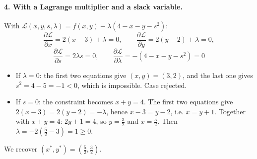 \documentclass[]{article}
\begin{document}
	\paragraph{4. With a Lagrange multiplier and a slack variable.}
	With $\mathcal{L}(x,y,s,\lambda) = f(x,y) - \lambda(4 - x - y - s^2)$:
	$$
	\frac{\partial \mathcal{L}}{\partial x} = 2(x-3) + \lambda = 0,
	\qquad
	\frac{\partial \mathcal{L}}{\partial y} = 2(y-2) + \lambda = 0,
	$$
	$$
	\frac{\partial \mathcal{L}}{\partial s} = 2\lambda s = 0,
	\qquad
	\frac{\partial \mathcal{L}}{\partial \lambda} = -(4 - x - y - s^2) = 0
	$$
	\begin{itemize}
		\item If $\lambda = 0$: the first two equations give $(x,y) = (3,2)$, and the last one gives $s^2 = 4 - 5 = -1 < 0$, which is impossible.
		Case rejected.
		\item If $s = 0$: the constraint becomes $x + y = 4$.
		The first two equations give $2(x-3) = 2(y-2) = -\lambda$, hence $x - 3 = y - 2$, i.e. $x = y + 1$.
		Together with $x + y = 4$: $2y + 1 = 4$, so $y = \frac{3}{2}$ and $x = \frac{5}{2}$.
		Then $\lambda = -2\left(\frac{5}{2} - 3\right) = 1 \geq 0$. \checkmark
	\end{itemize}
	We recover $(x^*,y^*) = \left(\frac{5}{2}, \frac{3}{2}\right)$. \checkmark
\end{document}
